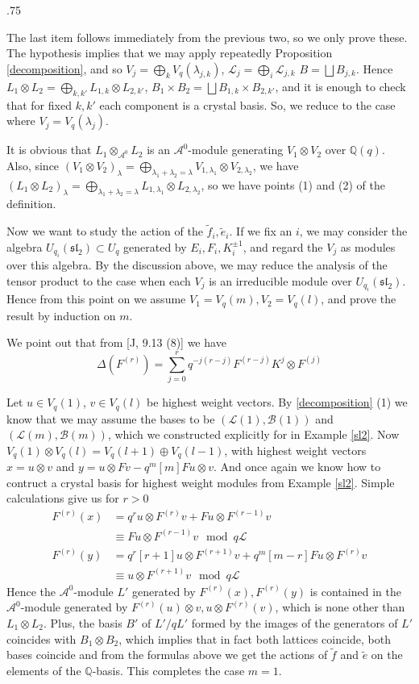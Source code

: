 \documentclass[11pt,fleqn]{article}
\makeatletter
\renewenvironment{proof}[1][\proofname]{\par
  \pushQED{\qed}%
  \normalfont \topsep.75\paraskip\relax
  \trivlist
  \item[\hskip\labelsep
        \itshape
    #1\@addpunct{.}]\ignorespaces
}{%
  \popQED\endtrivlist\@endpefalse
}
\newcommand\QQ{\mathbb Q}
\newcommand\ot{\otimes}
\newcommand\A{\mathcal A}
\newcommand\B{\mathcal B}
\renewcommand\L{\mathcal L}
\makeatother
\begin{document}
\begin{proof}
The last item follows immediately from the previous two, so we only prove these. The
hypothesis implies that we may apply repeatedly Proposition \ref{decomposition}, and so
$V_j = \bigoplus_k V_q(\lambda_{j,k})$, $\L_j = \bigoplus_i \L_{j,k}$ $B = \bigsqcup
B_{j,k}$. Hence $L_1 \ot L_2 = \bigoplus_{k,k'} L_{1,k} \ot L_{2,k'}$, $B_1 \times B_2 =
\bigsqcup B_{1,k} \times B_{2,k'}$, and it is enough to check that for fixed $k, k'$ each
component is a crystal basis. So, we reduce to the case where $V_j = V_q(\lambda_j)$.

It is obvious that $L_1 \ot_{\A^0} L_2$ is an $\A^0$-module generating $V_1 \ot V_2$ over
$\QQ(q)$. Also, since $(V_1 \ot V_2)_{\lambda} = \bigoplus_{\lambda_1 + \lambda_2 =
\lambda} V_{1,\lambda_1} \ot V_{2,\lambda_2}$, we have $(L_1 \ot L_2)_\lambda =
\bigoplus_{\lambda_ 1 + \lambda_2 = \lambda} L_{1,\lambda_1} \ot L_{2, \lambda_2}$, so we
have points (1) and (2) of the definition.

Now we want to study the action of the $\tilde f_i, \tilde e_i$. If we fix an $i$, we may
consider the algebra $U_{q_i}(\mathfrak{sl}_2) \subset U_q$ generated by $E_i, F_i,
K_i^{\pm 1}$, and regard the $V_j$ as modules over this algebra. By the discussion above,
we may reduce the analysis of the tensor product to the case when each $V_j$ is an
irreducible module over $U_{q_i}(\mathfrak{sl}_2)$. Hence from this point on we assume 
$V_1 = V_q(m), V_2 = V_q(l)$, and prove the result by induction on $m$.

We point out that from [J, 9.13 (8)] we have 
$$ \Delta(F^{(r)}) = \sum_{j=0}^r q^{-j(r-j)}F^{(r-j)}K^{j} \ot F^{(j)}$$

Let $u \in V_q(1)$, $v \in V_q(l)$ be highest weight vectors. By \ref{decomposition} (1) 
we know that we may assume the bases to be $(\L(1),\B(1))$ and $(\L(m), \B(m))$, which we
constructed explicitly for in Example \ref{sl2}. Now $V_q(1) \ot V_q(l) =
V_q(l+1) \oplus V_q(l-1)$, with highest weight vectors $x=u \ot v$ and $y=u \ot Fv - q^m [m]
Fu \ot v$. And once again we know how to contruct a crystal basis for highest weight modules 
from Example \ref{sl2}. Simple calculations give us for $r > 0$
	\begin{align*}
		F^{(r)}(x) &= q^r u \ot F^{(r)}v + Fu \ot F^{(r-1)}v \\
			&\equiv Fu \ot F^{(r-1)}v \mod q \L \\ 
		F^{(r)}(y) &= q^r[r+1]u \ot F^{(r+1)}v + q^m[m-r]Fu \ot F^{(r)}v \\ 
			&\equiv u \ot F^{(r+1)}v \mod q \L
	\end{align*}
Hence the $\A^0$-module $L'$ generated by $F^{(r)}(x), F^{(r)}(y)$ is contained in the
$\A^0$-module generated by $F^{(r)}(u) \ot v, u \ot F^{(r)}(v)$, which is none other than
$L_1 \ot L_2$. Plus, the basis $B'$ of $L'/qL'$ formed by the images of the generators of $L'$
coincides with $B_1 \ot B_2$, which implies that in fact both lattices coincide, both
bases coincide and from the formulas above we get the actions of $\tilde f$ and $\tilde e$
on the elements of the $\QQ$-basis. This completes the case $m=1$.


\end{proof}
\end{document}
